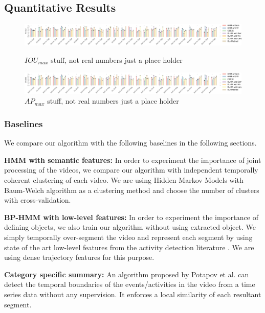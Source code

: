 \subsection{Quantitative Results}
\begin{figure}[t]
  \includegraphics[width=\textwidth]{miou}
  \caption{$IOU_{max}$ stuff, not real numbers just a place holder}
  \label{mIOU}
\includegraphics[width=\textwidth]{miou}
\caption{$AP_{max}$ stuff, not real numbers just a place holder}
\label{mmAP}
\end{figure}

\subsubsection{Baselines}
We compare our algorithm with the following baselines in the following sections.

\noindent\textbf{HMM with semantic features:}
In order to experiment the importance of joint processing of the videos, we compare our algorithm with independent temporally coherent clustering of each video. We are using Hidden Markov Models with Baum-Welch algorithm\cite{rabiner} as a clustering method and choose the number of clusters with cross-validation.

\noindent\textbf{BP-HMM with low-level features:}
In order to experiment the importance of defining objects, we also train our algorithm without using extracted object. We simply temporally over-segment the video and represent each segment by using state of the art low-level features from the activity detection literature \cite{acticityFeature}. We are using dense trajectory features for this purpose.

\noindent\textbf{Category specific summary\cite{potapov2014category}:}
An algorithm proposed by Potapov et al.\cite{potapov2014category} can detect the temporal boundaries of the events/activities in the video from a time series data without any supervision. It enforces a local similarity of each resultant segment.

